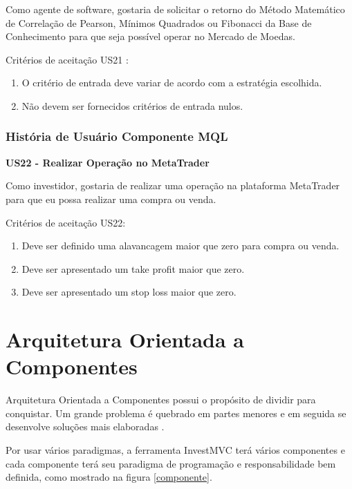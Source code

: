 Como agente de software, gostaria de solicitar o retorno do Método Matemático de Correlação de Pearson, Mínimos Quadrados ou Fibonacci da Base de Conhecimento para que seja possível operar no Mercado de Moedas.


Critérios de aceitação US21 :

\begin{enumerate}
\item O critério de entrada deve variar de acordo com a estratégia escolhida.
\item Não devem ser fornecidos critérios de entrada nulos.
\end{enumerate}

\subsubsection{História de Usuário Componente MQL}

\textbf{US22 - Realizar Operação no MetaTrader}

Como investidor, gostaria de realizar uma operação na plataforma MetaTrader para que eu possa realizar uma compra ou venda.

Critérios de aceitação US22:

\begin{enumerate}
\item Deve ser definido uma alavancagem maior que zero para compra ou venda.
\item Deve ser apresentado um take profit maior que zero.
\item Deve ser apresentado um stop loss maior que zero.
\end{enumerate}

\section{Arquitetura Orientada a Componentes}

Arquitetura Orientada a Componentes possui o propósito de dividir para conquistar. Um grande problema é quebrado em partes menores e em seguida se desenvolve soluções mais elaboradas \cite{john}.

Por usar vários paradigmas, a ferramenta InvestMVC terá vários componentes e cada componente terá seu paradigma de programação e responsabilidade bem definida, como mostrado na figura \ref{componente}.

